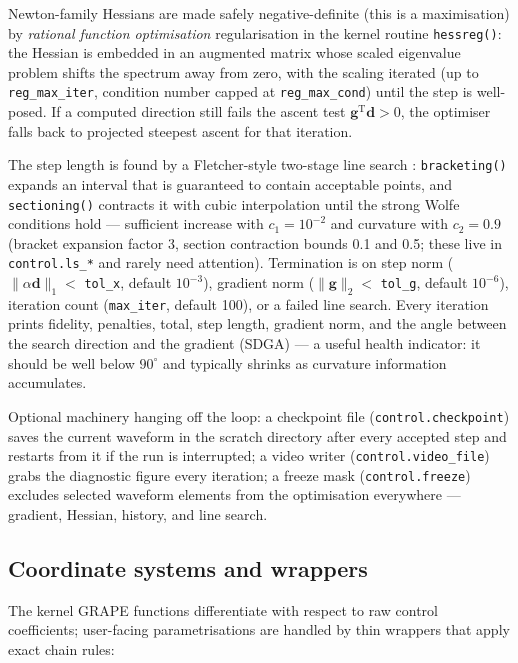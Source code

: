 \documentclass[11pt,a4paper]{article}
\newcommand{\code}[1]{\texttt{#1}}
\begin{document}
Newton-family Hessians are made safely negative-definite (this is a
maximisation) by \emph{rational function optimisation} regularisation
\cite{banerjee1985} in the kernel routine \code{hessreg()}: the Hessian
is embedded in an augmented matrix whose scaled eigenvalue problem shifts
the spectrum away from zero, with the scaling iterated (up to
\code{reg\_max\_iter}, condition number capped at \code{reg\_max\_cond})
until the step is well-posed. If a computed direction still fails the
ascent test $\mathbf{g}^{\mathrm{T}}\mathbf{d}>0$, the optimiser falls
back to projected steepest ascent for that iteration.

The step length is found by a Fletcher-style two-stage line search
\cite{fletcher2000}: \code{bracketing()} expands an interval that is
guaranteed to contain acceptable points, and \code{sectioning()}
contracts it with cubic interpolation until the strong Wolfe conditions
hold --- sufficient increase with $c_1=10^{-2}$ and curvature with
$c_2=0.9$ (bracket expansion factor 3, section contraction bounds 0.1 and
0.5; these live in \code{control.ls\_*} and rarely need attention).
Termination is on step norm ($\|\alpha\mathbf{d}\|_1<$ \code{tol\_x},
default $10^{-3}$), gradient norm ($\|\mathbf{g}\|_2<$ \code{tol\_g},
default $10^{-6}$), iteration count (\code{max\_iter}, default 100), or a
failed line search. Every iteration prints fidelity, penalties, total,
step length, gradient norm, and the angle between the search direction
and the gradient (SDGA) --- a useful health indicator: it should be well
below $90^\circ$ and typically shrinks as curvature information
accumulates.

Optional machinery hanging off the loop: a checkpoint file
(\code{control.checkpoint}) saves the current waveform in the scratch
directory after every accepted step and restarts from it if the run is
interrupted; a video writer (\code{control.video\_file}) grabs the
diagnostic figure every iteration; a freeze mask
(\code{control.freeze}) excludes selected waveform elements from the
optimisation everywhere --- gradient, Hessian, history, and line search.

\subsection{Coordinate systems and wrappers}
\label{sec:wrappers}

The kernel GRAPE functions differentiate with respect to raw control
coefficients; user-facing parametrisations are handled by thin wrappers
that apply exact chain rules:
\end{document}

